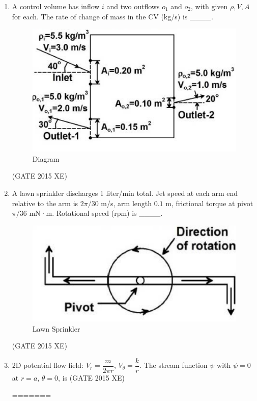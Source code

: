 \documentclass[journal,12pt,onecolumn]{IEEEtran}
\begin{document}
\begin{enumerate}
\begin{enumerate}
\begin{enumerate}[label=\arabic*)]
\item A control volume has inflow $i$ and two outflows $o_1$ and $o_2$, with given $\rho, V, A$ for each. The rate of change of mass in the CV (kg/s) is \_\_\_\_.


\begin{figure}[htbp]
  \centering
  \includegraphics[width=.68\columnwidth]{figs/B/fig5.png} 
  \caption{Diagram}
  \label{fig:figs/B/fig5.png}
\end{figure}
\hfill{(GATE 2015 XE)} \\


\item A lawn sprinkler discharges 1 liter/min total. Jet speed at each arm end relative to the arm is $2\pi/30$ m/s, arm length $0.1$ m, frictional torque at pivot $\pi/36$ mN·m. Rotational speed (rpm) is \_\_\_\_.

\begin{figure}[htbp]
  \centering
  \includegraphics[width=.5\columnwidth]{figs/B/fig6.png} 
  \caption{Lawn Sprinkler}
  \label{fig:figs/B/fig6.png}
\end{figure}
\hfill{(GATE 2015 XE)} \\

\newpage

\item 2D potential flow field: $V_r = \dfrac{m}{2\pi r}$, $V_\theta = \dfrac{k}{r}$. The stream function $\psi$ with $\psi=0$ at $r=a$, $\theta=0$, is
\hfill{(GATE 2015 XE)} \\
\begin{multicols}{4}
\begin{enumerate}
=======
\vspace{0.5cm}


\end{enumerate}
\end{multicols}
\end{enumerate}
\end{enumerate}
\end{enumerate}
\end{document}
